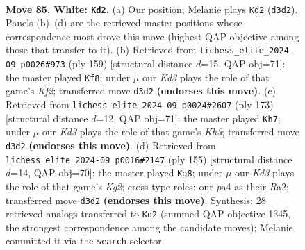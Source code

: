 \documentclass[11pt]{article}
\begin{document}
\clearpage

\begin{figure}[p]\centering
\begin{subfigure}{0.46\textwidth}\centering
\resizebox{\linewidth}{!}{%
\newchessgame
\chessboard[
  setfen={8/8/8/2p2k2/p2p4/2rK4/8/8 w - - 10 85},
  showmover=false,
  pgfstyle=straightmove, color=movearrow, markmove={d3-d2}
]}
\caption{}
\end{subfigure}\hfill
\begin{subfigure}{0.46\textwidth}\centering
\resizebox{\linewidth}{!}{%
\newchessgame
\chessboard[
  setfen={8/4Rk2/5P2/6P1/8/1p6/6r1/1K6 b - - 37 80},
  showmover=false,
  pgfstyle=straightmove, color=movearrow, markmove={f7-f8}
]}
\caption{}
\end{subfigure}
\\[4pt]
\begin{subfigure}{0.46\textwidth}\centering
\resizebox{\linewidth}{!}{%
\newchessgame
\chessboard[
  setfen={8/8/6Rk/5K2/6PP/5P2/8/8 b - - 2 87},
  showmover=false,
  pgfstyle=straightmove, color=movearrow, markmove={h6-h7}
]}
\caption{}
\end{subfigure}\hfill
\begin{subfigure}{0.46\textwidth}\centering
\resizebox{\linewidth}{!}{%
\newchessgame
\chessboard[
  setfen={8/5Rk1/6P1/7K/8/8/r7/8 b - - 4 78},
  showmover=false,
  pgfstyle=straightmove, color=movearrow, markmove={g7-g8}
]}
\caption{}
\end{subfigure}
\caption{\textbf{Move 85, White: \texttt{Kd2}.} (a) Our position; Melanie plays \texttt{Kd2} (\texttt{d3d2}). Panels (b)--(d) are the retrieved master positions whose correspondence most drove this move (highest QAP objective among those that transfer to it). (b) Retrieved from \texttt{lichess\_elite\_2024-09\_p0026\#973} (ply 159) [structural distance $d$=15, QAP obj=71]: the master played \texttt{Kf8}; under $\mu$ our \emph{Kd3} plays the role of that game's \emph{Kf2}; transferred move \texttt{d3d2} \textbf{(endorses this move)}. (c) Retrieved from \texttt{lichess\_elite\_2024-09\_p0024\#2607} (ply 173) [structural distance $d$=12, QAP obj=71]: the master played \texttt{Kh7}; under $\mu$ our \emph{Kd3} plays the role of that game's \emph{Kh3}; transferred move \texttt{d3d2} \textbf{(endorses this move)}. (d) Retrieved from \texttt{lichess\_elite\_2024-09\_p0016\#2147} (ply 155) [structural distance $d$=14, QAP obj=70]: the master played \texttt{Kg8}; under $\mu$ our \emph{Kd3} plays the role of that game's \emph{Kg2}; cross-type roles: our \emph{p}a4 as their \emph{R}a2; transferred move \texttt{d3d2} \textbf{(endorses this move)}. Synthesis: 28 retrieved analogs transferred to \texttt{Kd2} (summed QAP objective 1345, the strongest correspondence among the candidate moves); Melanie committed it via the \texttt{search} selector.}
\label{fig:thought-m168}
\end{figure}
\end{document}
